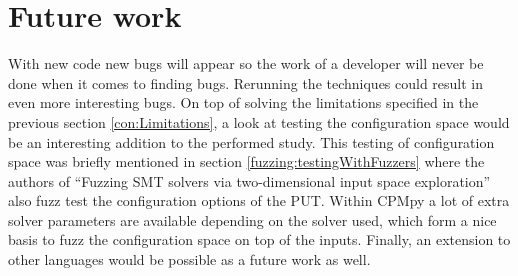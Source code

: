


\section{Future work}
\label{con:FutureWork}
With new code new bugs will appear so the work of a developer will never be done when it comes to finding bugs. Rerunning the techniques could result in even more interesting bugs. 
On top of solving the limitations specified in the previous section \ref{con:Limitations},
a look at testing the configuration space would be an interesting addition to the performed study. This testing of configuration space was briefly mentioned in section \ref{fuzzing:testingWithFuzzers} where the authors of “Fuzzing SMT solvers via two-dimensional input space exploration” \cite{42FalconFuzzingConfigurationSettingsAndNormal} also fuzz test the configuration options of the PUT. Within CPMpy a lot of extra solver parameters are available depending on the solver used, which form a nice basis to fuzz the configuration space on top of the inputs.
Finally, an extension to other languages would be possible as a future work as well.


